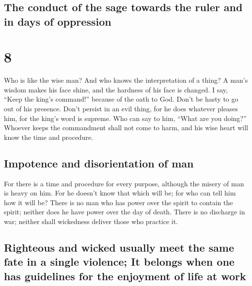 \begin{paracol}{2}
\begin{otherlanguage}{english}
\hypertarget{the-conduct-of-the-sage-towards-the-ruler-and-in-days-of-oppression}{%
\subsection{The conduct of the sage towards the ruler and in days of
oppression}\label{the-conduct-of-the-sage-towards-the-ruler-and-in-days-of-oppression}}

\hypertarget{section-15}{%
\section{8}\label{section-15}}

 Who is like the wise man? And who knows the
interpretation of a thing? A man's wisdom makes his face shine, and the
hardness of his face is changed.  I say, ``Keep the king's
command!'' because of the oath to God.  Don't be hasty to
go out of his presence. Don't persist in an evil thing, for he does
whatever pleases him,  for the king's word is supreme. Who
can say to him, ``What are you doing?''  Whoever keeps the
commandment shall not come to harm, and his wise heart will know the
time and procedure.

\hypertarget{impotence-and-disorientation-of-man}{%
\subsection{Impotence and disorientation of
man}\label{impotence-and-disorientation-of-man}}

 For there is a time and procedure for every purpose,
although the misery of man is heavy on him.  For he
doesn't know that which will be; for who can tell him how it will be?
 There is no man who has power over the spirit to contain
the spirit; neither does he have power over the day of death. There is
no discharge in war; neither shall wickedness deliver those who practice
it.

\hypertarget{righteous-and-wicked-usually-meet-the-same-fate-in-a-single-violence-it-belongs-when-one-has-guidelines-for-the-enjoyment-of-life-at-work}{%
\subsection{Righteous and wicked usually meet the same fate in a single
violence; It belongs when one has guidelines for the enjoyment of life
at
work}\label{righteous-and-wicked-usually-meet-the-same-fate-in-a-single-violence-it-belongs-when-one-has-guidelines-for-the-enjoyment-of-life-at-work}}


\end{otherlanguage}
\end{paracol}
